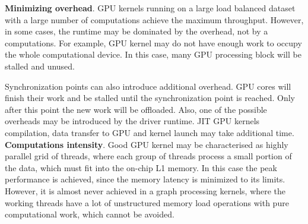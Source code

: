 \textbf{Minimizing overhead}. GPU kernels running on a large load balanced dataset with a large number of computations achieve the maximum throughput. However, in some cases, the runtime may be dominated by the overhead, not by a computations. For example, GPU kernel may do not have enough work to occupy the whole computational device. In this case, many GPU processing block will be stalled and unused. 

Synchronization points can also introduce additional overhead. GPU cores will finish their work and be stalled until the synchronization point is reached. Only after this point the new work will be offloaded. Also, one of the possible overheads may be introduced by the driver runtime. JIT GPU kernels compilation, data transfer to GPU and kernel launch may take additional time.\\

\textbf{Computations intensity}. Good GPU kernel may be characterised as highly parallel grid of threads, where each group of threads process a small portion of the data, which must fit into the on-chip L1 memory. In this case the peak performance is achieved, since the memory latency is minimized to its limits. However, it is almost never achieved in a graph processing kernels, where the working threads have a lot of unstructured memory load operations with pure computational work, which cannot be avoided.\\
